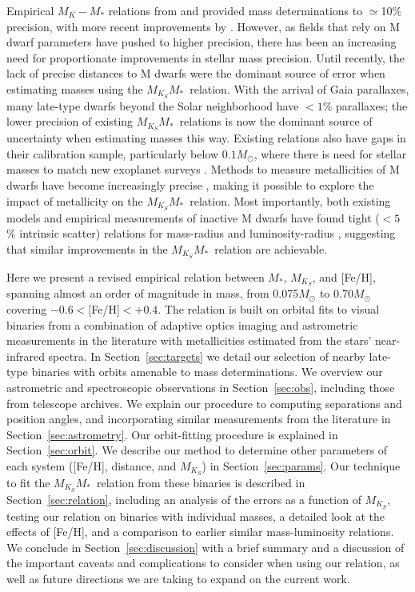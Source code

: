 \documentclass[twocolumn]{aastex62}
\newcommand{\mks}{$M_{K_S}$}
\newcommand{\mmk}{$M_{K_S}$\textendash$M_*$}
\begin{document}
Empirical $M_K-M_*$ relations from \citet{Hen1993} and \citet{Delfosse2000} provided mass determinations to $\simeq$10\% precision, with more recent improvements by \citet{Benedict2016}. However, as fields that rely on M dwarf parameters have pushed to higher precision, there has been an increasing need for proportionate improvements in stellar mass precision. Until recently, the lack of precise distances to M dwarfs were the dominant source of error when estimating masses using the \mmk\ relation. With the arrival of Gaia parallaxes, many late-type dwarfs beyond the Solar neighborhood have $<1\%$ parallaxes; the lower precision of existing \mmk\ relations is now the dominant source of uncertainty when estimating masses this way. Existing relations also have gaps in their calibration sample, particularly below $0.1M_\odot$, where there is need for stellar masses to match new exoplanet surveys \citep[e.g.,][]{Gillon2017}. Methods to measure metallicities of M dwarfs have become increasingly precise \citep[e.g.,][]{RojasAyala:2010, 2014A&A...568A.121N}, making it possible to explore the impact of metallicity on the \mmk\ relation. Most importantly, both existing models and empirical measurements of inactive M dwarfs have found tight ($<5$\% intrinsic scatter) relations for mass-radius \citep[e.g.,][]{Bayless2006,Spada2013,2017AJ....154..100H} and luminosity-radius \citep[e.g.,][]{Boyajian2012,2015ApJ...802L..10T,Mann2015b}, suggesting that similar improvements in the \mmk\ relation are achievable. 

Here we present a revised empirical relation between $M_*$, $M_{K_S}$, and [Fe/H], spanning almost an order of magnitude in mass, from 0.075$M_\odot$ to 0.70$M_\odot$ covering $-0.6<$[Fe/H]$<+0.4$. The relation is built on orbital fits to visual binaries from a combination of adaptive optics imaging and astrometric measurements in the literature with metallicities estimated from the stars' near-infrared spectra. In Section~\ref{sec:targets} we detail our selection of nearby late-type binaries with orbits amenable to mass determinations. We overview our astrometric and spectroscopic observations in Section~\ref{sec:obs}, including those from telescope archives. We explain our procedure to computing separations and position angles, and incorporating similar measurements from the literature in Section~\ref{sec:astrometry}. Our orbit-fitting procedure is explained in Section~\ref{sec:orbit}. We describe our method to determine other parameters of each system ([Fe/H], distance, and \mks) in Section~\ref{sec:params}. Our technique to fit the \mmk\ relation from these binaries is described in Section~\ref{sec:relation}, including an analysis of the errors as a function of \mks, testing our relation on binaries with individual masses, a detailed look at the effects of [Fe/H], and a comparison to earlier similar mass-luminosity relations. We conclude in Section~\ref{sec:discussion} with a brief summary and a discussion of the important caveats and complications to consider when using our relation, as well as future directions we are taking to expand on the current work.
\end{document}
